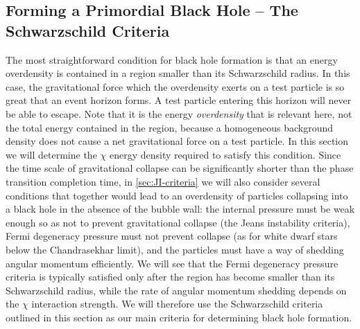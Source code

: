 \documentclass[
onecolumn, %
11pt, %
tightenlines,
superscriptaddress, %
nofootinbib, %
preprintnumbers, %
prd %
]{revtex4-1}
\begin{document}
\subsection{Forming a Primordial Black Hole -- The Schwarzschild Criteria}
\label{sec:Schwarzschild-criteria}

The most straightforward condition for black hole formation is that an energy overdensity is contained in a region smaller than its Schwarzschild radius. In this case, the gravitational force which the overdensity exerts on a test particle is so great that an event horizon forms. A test particle entering this horizon will never be able to escape.  Note that it is the energy \emph{overdensity} that is relevant here, not the total energy contained in the region, because a homogeneous background density does not cause a net gravitational force on a test particle.  In this section we will determine the $\chi$ energy density required to satisfy this condition.  Since the time scale of gravitational collapse can be significantly shorter than the phase transition completion time, in \cref{sec:JI-criteria} we will also consider several conditions that together would lead to an overdensity of particles collapsing into a black hole in the absence of the bubble wall: the internal pressure must be weak enough so as not to prevent gravitational collapse (the Jeans instability criteria), Fermi degeneracy pressure must not prevent collapse (as for white dwarf stars below the Chandrasekhar limit), and the particles must have a way of shedding angular momentum efficiently.  We will see that the Fermi degeneracy pressure criteria is typically satisfied only after the region has become smaller than its Schwarzschild radius, while the rate of angular momentum shedding depends on the $\chi$ interaction strength.  We will therefore use the Schwarzschild criteria outlined in this section as our main criteria for determining black hole formation.
\end{document}
